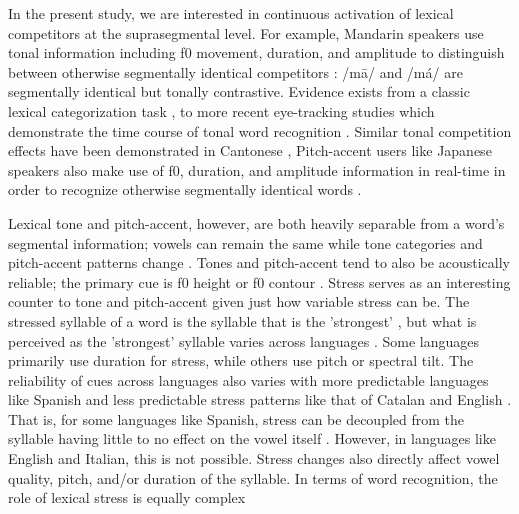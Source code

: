 In the present study, we are interested in continuous activation of lexical competitors at the suprasegmental level. For example, Mandarin speakers use tonal information including f0 movement, duration, and amplitude \cite[e.g.,][]{Zhang2022} to distinguish between otherwise segmentally identical competitors \cite{Lee2008}: /m\=a/ and /m\'a/ are segmentally identical but tonally contrastive. Evidence exists from a classic lexical categorization task \citep{fox_1985},  to more recent eye-tracking studies which demonstrate the time course of tonal word recognition \citep{zou_2022}. Similar tonal competition effects have been demonstrated in Cantonese \citep{qin_2022,Nixon2016}, Pitch-accent users like Japanese speakers also make use of f0, duration, and amplitude information in real-time in order to recognize otherwise segmentally identical words \citep{goss_2014,Cutler1999,Ito2024}.

Lexical tone and pitch-accent, however, are both heavily separable from a word's segmental information; vowels can remain the same while tone categories and pitch-accent patterns change \citep{Zeng2017}. Tones and pitch-accent tend to also be acoustically reliable; the primary cue is f0 height or f0 contour \citep{goss_2014}.  Stress serves as an interesting counter to tone and pitch-accent given just how variable stress can be. The stressed syllable of a word is the syllable that is the 'strongest' \citep{sluijter1996spectral}, but what is perceived as the 'strongest' syllable varies across languages \citep{Cutler1988}. Some languages primarily use duration for stress, while others use pitch or spectral tilt. The reliability of cues across languages also varies with more predictable languages like Spanish and less predictable stress patterns like that of Catalan and English \citep{ortega_2011, beckman_1994}. That is, for some languages like Spanish, stress can be decoupled from the syllable having little to no effect on the vowel itself \citep{ortega_2011}. However, in languages like English and Italian, this is not possible. Stress changes also directly affect vowel quality, pitch, and/or duration of the syllable. In terms of word recognition, the role of lexical stress is equally complex \citep{cutler2001voornaam,Reinisch2010}

